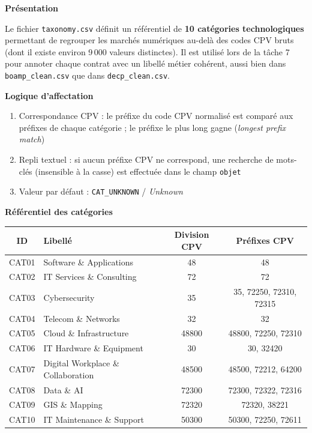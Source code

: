 \documentclass[12pt,a4paper]{article}
\begin{document}
\textbf{Présentation}

Le fichier \texttt{taxonomy.csv} définit un référentiel de \textbf{10
catégories technologiques} permettant de regrouper les marchés numériques
au-delà des codes CPV bruts (dont il existe environ 9\,000 valeurs distinctes).
Il est utilisé lors de la tâche 7 pour annoter chaque contrat avec un libellé
métier cohérent, aussi bien dans \texttt{boamp\_clean.csv} que dans
\texttt{decp\_clean.csv}.

\medskip
\textbf{Logique d'affectation}

\begin{enumerate}
  \item Correspondance CPV : le préfixe du code CPV normalisé est comparé
    aux préfixes de chaque catégorie ; le préfixe le plus long gagne
    (\textit{longest prefix match})
  \item Repli textuel : si aucun préfixe CPV ne correspond, une recherche de
    mots-clés (insensible à la casse) est effectuée dans le champ
    \texttt{objet}
  \item Valeur par défaut : \texttt{CAT\_UNKNOWN} / \textit{Unknown}
\end{enumerate}

\medskip
\textbf{Référentiel des catégories}

\begin{center}
\begin{tabular}{clcc}
\toprule
\textbf{ID} & \textbf{Libellé} & \textbf{Division CPV} &
  \textbf{Préfixes CPV} \\
\midrule
CAT01 & Software \& Applications          & 48     & 48 \\
CAT02 & IT Services \& Consulting         & 72     & 72 \\
CAT03 & Cybersecurity                     & 35     & 35, 72250, 72310, 72315 \\
CAT04 & Telecom \& Networks               & 32     & 32 \\
CAT05 & Cloud \& Infrastructure           & 48800  & 48800, 72250, 72310 \\
CAT06 & IT Hardware \& Equipment          & 30     & 30, 32420 \\
CAT07 & Digital Workplace \& Collaboration & 48500 & 48500, 72212, 64200 \\
CAT08 & Data \& AI                        & 72300  & 72300, 72322, 72316 \\
CAT09 & GIS \& Mapping                    & 72320  & 72320, 38221 \\
CAT10 & IT Maintenance \& Support         & 50300  & 50300, 72250, 72611 \\
\bottomrule
\end{tabular}
\end{center}
\end{document}
